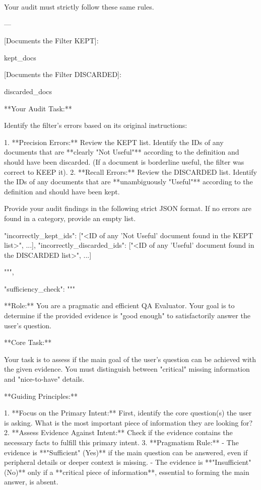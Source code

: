 \documentclass[11pt]{article}
\begin{document}
\begin{PromptBlock}
{  Your audit must strictly follow these same rules.

  ---

  [Documents the Filter KEPT]:

  {kept_docs}

  [Documents the Filter DISCARDED]:

  {discarded_docs}

  **Your Audit Task:**

  Identify the filter's errors based on its original instructions:

  1.  **Precision Errors:** Review the KEPT list. Identify the IDs of any documents that are **clearly "Not Useful"** according to the definition and should have been discarded. (If a document is borderline useful, the filter was correct to KEEP it).
  2.  **Recall Errors:** Review the DISCARDED list. Identify the IDs of any documents that are **unambiguously "Useful"** according to the definition and should have been kept.

  Provide your audit findings in the following strict JSON format. If no errors are found in a category, provide an empty list.

  {{
    "incorrectly_kept_ids": ["<ID of any 'Not Useful' document found in the KEPT list>", ...],
    "incorrectly_discarded_ids": ["<ID of any 'Useful' document found in the DISCARDED list>", ...]
  }}

  """,

  "sufficiency_check": """

  **Role:** You are a pragmatic and efficient QA Evaluator. Your goal is to determine if the provided evidence is "good enough" to satisfactorily answer the user's question.

  **Core Task:**

  Your task is to assess if the main goal of the user's question can be achieved with the given evidence. You must distinguish between "critical" missing information and "nice-to-have" details.

  **Guiding Principles:**

  1.  **Focus on the Primary Intent:** First, identify the core question(s) the user is asking. What is the most important piece of information they are looking for?
  2.  **Assess Evidence Against Intent:** Check if the evidence contains the necessary facts to fulfill this primary intent.
  3.  **Pragmatism Rule:**
      - The evidence is **"Sufficient" (Yes)** if the main question can be answered, even if peripheral details or deeper context is missing.
      - The evidence is **"Insufficient" (No)** only if a **critical piece of information**, essential to forming the main answer, is absent.

}
\end{PromptBlock}
\end{document}
